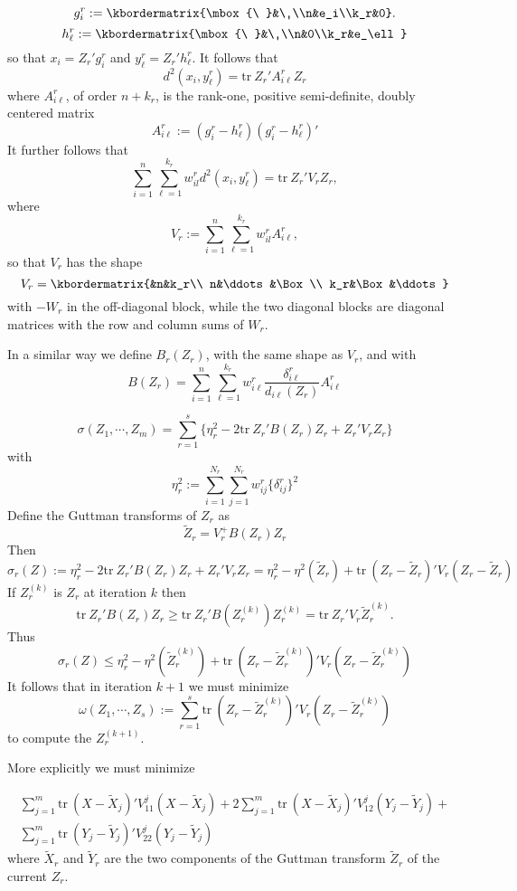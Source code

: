 \documentclass[
  12pt,
]{article}
\begin{document}
\[
g_i^r:=\kbordermatrix{\mbox{\ }&\ \\n&e_i\\k_r&0}.
\]
\[
h_\ell^r:=\kbordermatrix{\mbox{\ }&\ \\n&0\\k_r&e_\ell}
\]
so that \(x_i=Z_r'g_i^r\) and \(y_\ell^r=Z_r'h_\ell^r\). It follows that
\[
d^2(x_i,y_\ell^r)=\text{tr}\ Z_r'A^r_{i\ell}Z_r^{\ }
\]
where \(A_{i\ell}^r\), of order \(n+k_r\), is the rank-one, positive semi-definite, doubly centered matrix
\[
A_{i\ell}^r:=(g_i^r-h_\ell^r)(g_i^r-h_\ell^r)'
\]
It further follows that
\[
\sum_{i=1}^n\sum_{\ell=1}^{k_r}w_{il}^rd^2(x_i,y_\ell^r)=\text{tr}\ Z_r'V_rZ_r,
\]
where
\[
V_r:=\sum_{i=1}^n\sum_{\ell=1}^{k_r}w_{il}^rA^r_{i\ell},
\]
so that \(V_r\) has the shape
\[
V_r=\kbordermatrix{&n&k_r\\
n&\ddots&\Box\\
k_r&\Box&\ddots}
\]
with \(-W_r\) in the off-diagonal block, while the two diagonal
blocks are diagonal matrices with the row and column sums of \(W_r\).

In a similar way we define \(B_r(Z_r)\), with the same shape as \(V_r\), and with
\[
B(Z_r)=\sum_{i=1}^n\sum_{\ell=1}^{k_r}w_{i\ell}^r\frac{\delta_{i\ell}^r }{d_{i\ell}(Z_r)}A^r_{i\ell}
\]

\[
\sigma(Z_1,\cdots,Z_m)=\sum_{r=1}^s\{\eta_r^2-2\text{tr}\ Z_r'B(Z_r)Z_r+Z_r'V_rZ_r\}
\]
with
\[
\eta_r^2:=\sum_{i=1}^{N_r}\sum_{j=1}^{N_r}w_{ij}^r\{\delta_{ij}^r\}^2
\]
Define the Guttman transforms of \(Z_r\) as
\[
\tilde Z_r=V_r^+B(Z_r)Z_r
\]
Then
\[
\sigma_r(Z):=\eta_r^2-2\text{tr}\ Z_r'B(Z_r)Z_r+Z_r'V_rZ_r=\eta_r^2-\eta^2(\tilde Z_r)+\text{tr}\ (Z_r-\tilde Z_r)'V_r(Z_r-\tilde Z_r)
\]
If \(Z_r^{(k)}\) is \(Z_r\) at iteration \(k\) then
\[
\text{tr}\ Z_r'B(Z_r)Z_r\geq\text{tr}\ Z_r'B(Z_r^{(k)})Z_r^{(k)}=\text{tr}\ Z_r'V_r\tilde Z_r^{(k)}.
\]
Thus
\[
\sigma_r(Z)\leq\eta_r^2-\eta^2(\tilde Z_r^{(k)})+\text{tr}\ (Z_r-\tilde Z_r^{(k)})'V_r(Z_r-\tilde Z_r^{(k)})
\]
It follows that in iteration \(k+1\) we must minimize
\[
\omega(Z_1,\cdots,Z_s):=\sum_{r=1}^s\text{tr}\ (Z_r-\tilde Z_r^{(k)})'V_r(Z_r-\tilde Z_r^{(k)})
\]
to compute the \(Z_r^{(k+1)}\).

More explicitly we must minimize

\begin{multline}
\sum_{j=1}^m\text{tr}\ (X-\tilde X_j)'V_{11}^j(X-\tilde X_j)+2\sum_{j=1}^m\text{tr}\ (X-\tilde X_j)'V_{12}^j(Y_j-\tilde Y_j)+\\\sum_{j=1}^m\text{tr}\ (Y_j-\tilde Y_j)'V_{22}^j(Y_j-\tilde Y_j)
\end{multline}
where \(\tilde X_r\) and \(\tilde Y_r\) are the two components of the Guttman
transform \(\tilde Z_r\) of the current \(Z_r\).
\end{document}
